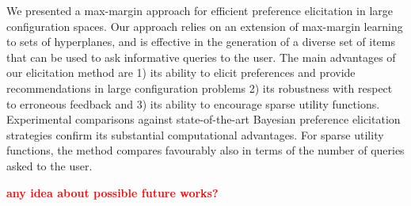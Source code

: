 \documentclass{article}
\renewcommand\[{\begin{equation}}
\renewcommand\]{\end{equation}}
\newcommand{\paolo}[1]{{\bf \textcolor{red}{{\fbox{Paolo:} #1}}}}
\begin{document}
We presented a max-margin approach for efficient preference
elicitation in large configuration spaces. Our approach relies on an
extension of max-margin learning to sets of hyperplanes, and is
effective in the generation of a diverse set of items that can be used
to ask informative queries to the user.  The main advantages of our
elicitation method are 1) its ability to elicit preferences and
provide recommendations in large configuration problems 2) its
robustness with respect to erroneous feedback and 3) its ability to
encourage sparse utility functions. Experimental comparisons against
state-of-the-art Bayesian preference elicitation strategies confirm
its substantial computational advantages. For sparse utility
functions, the method compares favourably also in terms of the number
of queries asked to the user.

\paolo{any idea about possible future works?}






\end{document}
